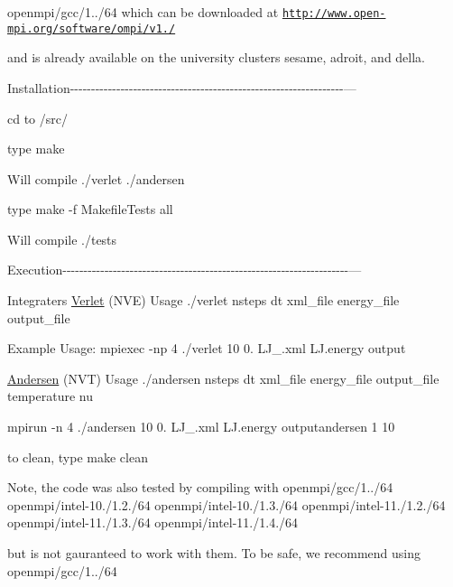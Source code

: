 openmpi/gcc/1../64 which can be downloaded at \href{http://www.open-mpi.org/software/ompi/v1.2/}{\tt http\-://www.\-open-\/mpi.\-org/software/ompi/v1./}

and is already available on the university clusters sesame, adroit, and della.

Installation-\/-\/-\/-\/-\/-\/-\/-\/-\/-\/-\/-\/-\/-\/-\/-\/-\/-\/-\/-\/-\/-\/-\/-\/-\/-\/-\/-\/-\/-\/-\/-\/-\/-\/-\/-\/-\/-\/-\/-\/-\/-\/-\/-\/-\/-\/-\/-\/-\/-\/-\/-\/-\/-\/-\/-\/-\/-\/-\/-\/-\/-\/-\/-\/-\/---

cd to /src/

type make

Will compile ./verlet ./andersen

type make -\/f Makefile\-Tests all

Will compile ./tests

Execution-\/-\/-\/-\/-\/-\/-\/-\/-\/-\/-\/-\/-\/-\/-\/-\/-\/-\/-\/-\/-\/-\/-\/-\/-\/-\/-\/-\/-\/-\/-\/-\/-\/-\/-\/-\/-\/-\/-\/-\/-\/-\/-\/-\/-\/-\/-\/-\/-\/-\/-\/-\/-\/-\/-\/-\/-\/-\/-\/-\/-\/-\/-\/-\/-\/-\/-\/-\/---

Integraters \hyperlink{classVerlet}{Verlet} (N\-V\-E) Usage ./verlet nsteps dt xml\-\_\-file energy\-\_\-file output\-\_\-file

Example Usage\-: mpiexec -\/np 4 ./verlet 10 0. L\-J\-\_.\-xml L\-J.\-energy output

\hyperlink{classAndersen}{Andersen} (N\-V\-T) Usage ./andersen nsteps dt xml\-\_\-file energy\-\_\-file output\-\_\-file temperature nu

mpirun -\/n 4 ./andersen 10 0. L\-J\-\_.\-xml L\-J.\-energy outputandersen 1 10

to clean, type make clean

Note, the code was also tested by compiling with openmpi/gcc/1../64 openmpi/intel-\/10./1.2./64 openmpi/intel-\/10./1.3./64 openmpi/intel-\/11./1.2./64 openmpi/intel-\/11./1.3./64 openmpi/intel-\/11./1.4./64

but is not gauranteed to work with them. To be safe, we recommend using openmpi/gcc/1../64 